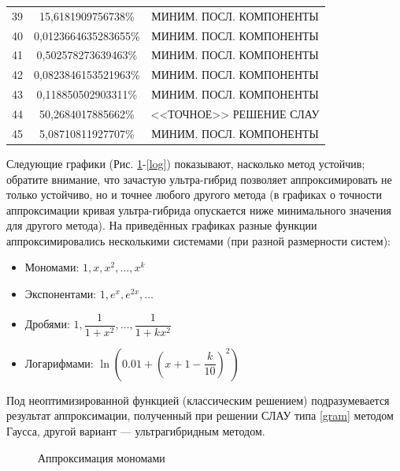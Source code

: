 \documentclass[a4paper, 12pt]{article}
\begin{document}
\begin{table}[h]
\begin{center}
\begin{tabular}[t]{|c|c|c|}
39& 15,6181909756738\% &МИНИМ. ПОСЛ. КОМПОНЕНТЫ\\
40& 0,0123664635283655\% &МИНИМ. ПОСЛ. КОМПОНЕНТЫ\\
41& 0,502578273639463\% &МИНИМ. ПОСЛ. КОМПОНЕНТЫ\\
42& 0,0823846153521963\% &МИНИМ. ПОСЛ. КОМПОНЕНТЫ\\
43& 0,118850502903311\% &МИНИМ. ПОСЛ. КОМПОНЕНТЫ\\
44& 50,2684017885662\% &<<ТОЧНОЕ>> РЕШЕНИЕ СЛАУ\\
45& 5,08710811927707\% &МИНИМ. ПОСЛ. КОМПОНЕНТЫ \\
 \hline
  \end{tabular}
\end{center}
\end{table}



Следующие графики (Рис. \ref{monex}-\ref{log}) показывают, насколько метод устойчив;
обратите внимание, что зачастую ультра-гибрид позволяет аппроксимировать не только устойчиво,
но и точнее любого другого метода (в графиках о точности аппроксимации кривая ультра-гибрида опускается ниже минимального значения для другого метода).
На приведённых графиках разные функции аппроксимировались несколькими системами (при разной размерности систем):
\begin{itemize}
  \item Мономами: $1, x, x^2,\dots , x^k$
  \item Экспонентами: $1, e^x, e^{2x},\dots$
  \item Дробями: $1,\dfrac{1}{1+x^2}, \dots , \dfrac{1}{1+kx^2}$
  \item Логарифмами: $\ln\left(0.01 + \left(x+1-\dfrac{k}{10}\right)^2\right)$
\end{itemize}
Под неоптимизированной функцией (классическим решением) подразумевается результат аппроксимации, полученный при решении СЛАУ типа \ref{gram} методом Гаусса, другой вариант --- ультрагибридным методом.

\begin{figure}[h!]
  \noindent{}
 \caption{Аппроксимация мономами}
  \label{monex}
\end{figure}
\end{document}
